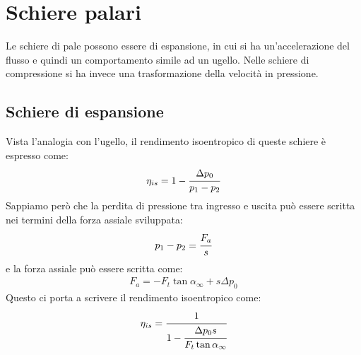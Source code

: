 \section{Schiere palari}
Le schiere di pale possono essere di espansione, in cui si ha un'accelerazione del flusso e quindi un comportamento simile ad un ugello. Nelle schiere di compressione si ha invece una trasformazione della velocità in pressione. 
\subsection{Schiere di espansione}
Vista l'analogia con l'ugello, il rendimento isoentropico di queste schiere è espresso come:
\begin{align*}
\eta_{is} = 1- \cfrac{\Delta p_0}{p_1 - p_2}
\end{align*}
Sappiamo però che la perdita di pressione tra ingresso e uscita può essere scritta nei termini della forza assiale sviluppata:
\begin{align*}
p_1-p_2 = \cfrac{F_a}{s}
\end{align*}
e la forza assiale può essere scritta come:
\begin{align*}
F_a=  - F_t \tan \alpha_{\infty} + s \Delta p_0
\end{align*}
Questo ci porta a scrivere il rendimento isoentropico come:
\begin{align*}
\eta_{is} = \cfrac{1}{1- \cfrac{\Delta p_0 s}{F_t \tan \alpha_{\infty}}}
\end{align*}

